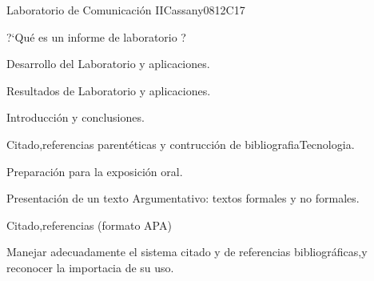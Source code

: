 \begin{syllabus}
\begin{outcomes}
   \item {}
   \item {}
\end{outcomes}

\begin{competences}
    \item {}
    \item {}
    \item {}
\end{competences}

\begin{unit}{Laboratorio de Comunicación II}{}{Cassany08}{12}{C17}
   \begin{topics}
      \item ?`Qué es un informe de laboratorio ?
      \item Desarrollo del Laboratorio y aplicaciones.
      \item Resultados de Laboratorio y aplicaciones.
      \item Introducción y conclusiones.
      \item Citado,referencias parentéticas y contrucción de bibliografiaTecnologia.
      \item Preparación para la exposición oral.
      \item Presentación de un texto Argumentativo: textos formales y  no formales.
      \item Citado,referencias (formato APA)
      
   \end{topics}
\begin{learningoutcomes}
      \item Manejar adecuadamente el sistema citado y de referencias bibliográficas,y reconocer la importacia de su uso.
   \end{learningoutcomes}
\end{unit}



\begin{coursebibliography}
\end{coursebibliography}

\end{syllabus}
